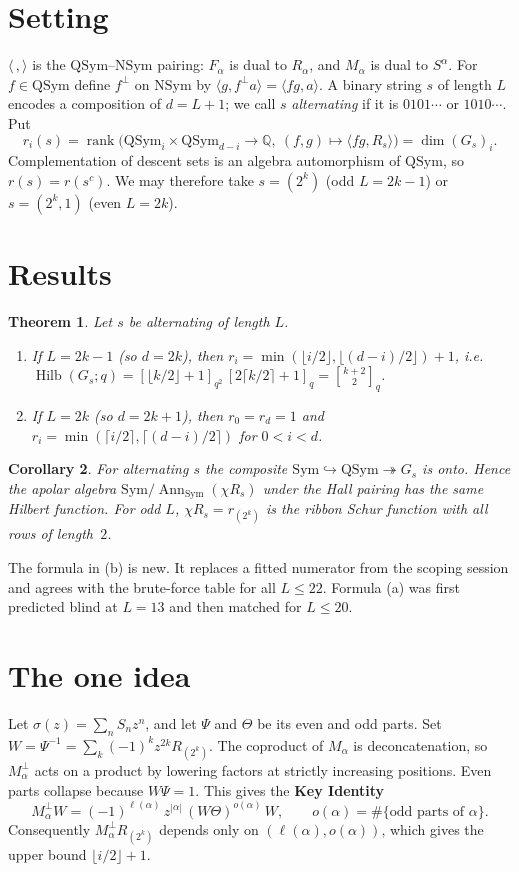\documentclass[11pt]{amsart}
\newcommand{\QSym}{\mathrm{QSym}}
\newcommand{\NSym}{\mathrm{NSym}}
\newcommand{\Sym}{\mathrm{Sym}}
\newcommand{\Ann}{\operatorname{Ann}}
\newcommand{\Hilb}{\operatorname{Hilb}}
\newcommand{\QQ}{\mathbb{Q}}
\newcommand{\qbin}[2]{\genfrac{[}{]}{0pt}{}{#1}{#2}_q}
\theoremstyle{plain}
\newtheorem{theorem}{Theorem}
\newtheorem{corollary}[theorem]{Corollary}
\theoremstyle{definition}
\begin{document}
\section{Setting}
$\langle\,,\rangle$ is the $\QSym$--$\NSym$ pairing: $F_\alpha$ is dual to $R_\alpha$, and $M_\alpha$ is dual to $S^\alpha$. For $f\in\QSym$ define $f^\perp$ on $\NSym$ by $\langle g,f^\perp a\rangle=\langle fg,a\rangle$. A binary string $s$ of length $L$ encodes a composition of $d=L+1$; we call $s$ \emph{alternating} if it is $0101\cdots$ or $1010\cdots$. Put
\[
r_i(s)=\operatorname{rank}\bigl(\QSym_i\times\QSym_{d-i}\to\QQ,\ (f,g)\mapsto\langle fg,R_s\rangle\bigr)=\dim (G_s)_i .
\]
Complementation of descent sets is an algebra automorphism of $\QSym$, so $r(s)=r(s^c)$. We may therefore take $s=(2^k)$ (odd $L=2k-1$) or $s=(2^k,1)$ (even $L=2k$).

\section{Results}
\begin{theorem}\label{thm:main}
Let $s$ be alternating of length $L$.
\begin{enumerate}[label=(\alph*),itemsep=1pt]
\item If $L=2k-1$ (so $d=2k$), then $r_i=\min(\lfloor i/2\rfloor,\lfloor (d-i)/2\rfloor)+1$, i.e.\ $\Hilb(G_s;q)=[\lfloor k/2\rfloor+1]_{q^2}\,[2\lceil k/2\rceil+1]_q=\qbin{k+2}{2}$.
\item If $L=2k$ (so $d=2k+1$), then $r_0=r_d=1$ and $r_i=\min(\lceil i/2\rceil,\lceil (d-i)/2\rceil)$ for $0<i<d$.
\end{enumerate}
\end{theorem}

\begin{corollary}\label{cor:sym}
For alternating $s$ the composite $\Sym\hookrightarrow\QSym\twoheadrightarrow G_s$ is onto. Hence the apolar algebra $\Sym/\Ann_{\Sym}(\chi R_s)$ under the Hall pairing has the same Hilbert function. For odd $L$, $\chi R_s=r_{(2^k)}$ is the ribbon Schur function with all rows of length~$2$.
\end{corollary}

The formula in (b) is new. It replaces a fitted numerator from the scoping session and agrees with the brute-force table for all $L\le22$. Formula (a) was first predicted blind at $L=13$ and then matched for $L\le20$.

\section{The one idea}\label{sec:idea}
Let $\sigma(z)=\sum_n S_nz^n$, and let $\Psi$ and $\Theta$ be its even and odd parts. Set $W=\Psi^{-1}=\sum_k(-1)^kz^{2k}R_{(2^k)}$. The coproduct of $M_\alpha$ is deconcatenation, so $M_\alpha^\perp$ acts on a product by lowering factors at strictly increasing positions. Even parts collapse because $W\Psi=1$. This gives the \textbf{Key Identity}
\[
M_\alpha^\perp W=(-1)^{\ell(\alpha)}\,z^{|\alpha|}\,(W\Theta)^{o(\alpha)}\,W,\qquad o(\alpha)=\#\{\text{odd parts of }\alpha\}.
\]
Consequently $M_\alpha^\perp R_{(2^k)}$ depends only on $(\ell(\alpha),o(\alpha))$, which gives the upper bound $\lfloor i/2\rfloor+1$.
\end{document}
